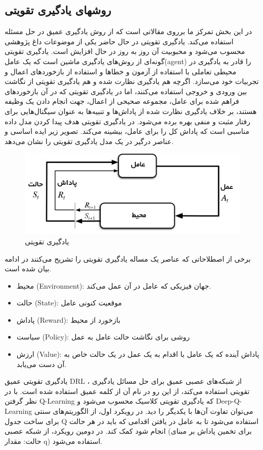 \subsection{روشهای یادگیری تقویتی}
در این بخش تمرکز ما بر‌روی مقالاتی است که از روش یادگیری عمیق در حل مسئله استفاده می‌کند. 
یادگیری تقویتی
 در حال حاضر یکی از موضوعات داغ پژوهشی محسوب می‌شود و محبوبیت آن روز به روز در حال افزایش است.
یادگیری تقویتی گونه‌ای از روش‌های یادگیری ماشین است که یک عامل(agent) را قادر به یادگیری در محیطی تعاملی با استفاده از آزمون و خطاها و استفاده از بازخوردهای اعمال و تجربیات خود می‌سازد. اگرچه هم یادگیری نظارت شده و هم یادگیری تقویتی از نگاشت بین ورودی و خروجی استفاده می‌کنند، اما در یادگیری تقویتی که در آن بازخوردهای فراهم شده برای عامل، مجموعه صحیحی از اعمال، جهت انجام دادن یک وظیفه هستند، بر خلاف یادگیری نظارت شده از پاداش‌ها و تنبیه‌ها به عنوان سیگنال‌هایی برای رفتار مثبت و منفی بهره برده می‌شود. 
  در یادگیری تقویتی هدف پیدا کردن مدل داده مناسبی است که پاداش کل را برای عامل، بیشینه می‌کند. تصویر زیر ایده اساسی و عناصر درگیر در یک مدل یادگیری تقویتی را نشان می‌دهد.
\begin{figure}
  \centering
    \includegraphics[scale=0.7]{./fig/rl}
  \caption{یادگیری تقویتی}
  \label{fig:rl}
\end{figure}
برخی از اصطلاحاتی که عناصر یک مساله یادگیری تقویتی را تشریح می‌کنند در ادامه بیان شده است.
\begin{itemize}
\item محیط (Environment):
 جهان فیزیکی که عامل در آن عمل می‌کند.
\item حالت (State):
 موقعیت کنونی عامل
\item پاداش (Reward):
 بازخورد از محیط
\item  سیاست (Policy):
 روشی برای نگاشت حالت عامل به عمل
\item  ارزش (Value):
 پاداش آینده که یک عامل با اقدام به یک عمل در یک حالت خاص به آن دست می‌یابد.
\end{itemize}
یادگیری تقویتی عمیق
DRL ،
 از شبکه‌های عصبی عمیق برای حل مسائل یادگیری تقویتی استفاده می‌کند، از این رو در نام آن از کلمه عمیق استفاده شده است. با در نظر گرفتن Q-Learning که یادگیری تقویتی کلاسیک محسوب می‌شود و Deep-Q-Learning می‌توان تفاوت آن‌ها با یکدیگر را دید. در رویکرد اول، از الگوریتم‌های سنتی برای ساخت جدول Q استفاده می‌شود تا به عامل در یافتن اقدامی که باید در هر حالت انجام شود کمک کند. در دومین رویکرد، از شبکه عصبی (برای تخمین پاداش بر مبنای حالت: مقدار q) استفاده می‌شود.

